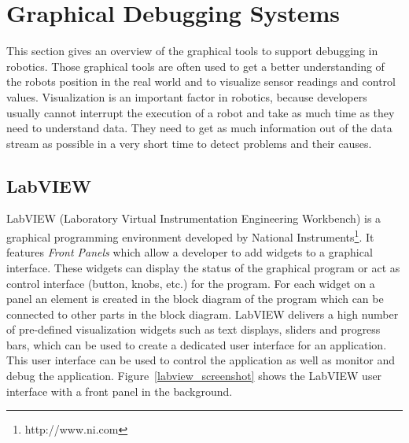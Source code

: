 \section{Graphical Debugging Systems}
This section gives an overview of the graphical tools to support debugging in robotics. Those graphical tools are often used to get a better understanding of the robots position in the real world and to visualize sensor readings and control values. Visualization is an important factor in robotics, because developers usually cannot interrupt the execution of a robot and take as much time as they need to understand data. They need to get as much information out of the data stream as possible in a very short time to detect problems and their causes.

\subsection{LabVIEW}

LabVIEW (Laboratory Virtual Instrumentation Engineering Workbench) is a graphical programming environment developed by National Instruments\footnote{http://www.ni.com}. It features \emph{Front Panels} which allow a developer to add widgets to a graphical interface. These widgets can display the status of the graphical program or act as control interface (button, knobs, etc.) for the program. For each widget on a panel an element is created in the block diagram of the program which can be connected to other parts in the block diagram. LabVIEW delivers a high number of pre-defined visualization widgets such as text displays, sliders and progress bars, which can be used to create a dedicated user interface for an application. This user interface can be used to control the application as well as monitor and debug the application. Figure~\ref{labview_screenshot} shows the LabVIEW user interface with a front panel in the background.

